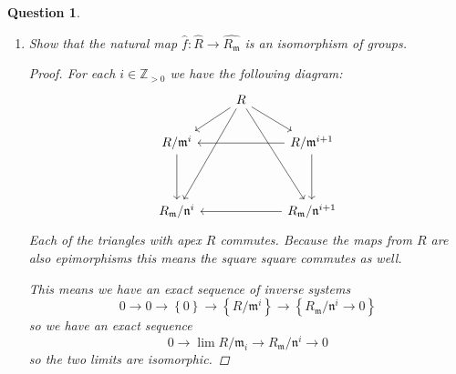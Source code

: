\documentclass{article}
\newcommand{\Z}{\mathbb{Z}}
\newcommand{\set}[1]{\left\{#1\right\}}
\newcommand{\maxid}{\mathfrak{m}}
\newcommand{\maxidd}{\mathfrak{n}}
\newtheorem{question}{Question}
\theoremstyle{definition}
\begin{document}
\begin{question}
\begin{enumerate}[a]
\begin{proof}
                  To show this is the induced map, we consider how this found
                  isomorphism works. Given some \(x\in R\) we have get the
                  following sequence from the above isomorphisms:
                  \[
                      R/\maxid^{i}\ni\overline{r}\mapsto \overline{\frac{r}{1}}\mapsto\frac{\overline{r}}{\overline{1}}=\overline{f(r)}\in R_{\maxid}/\maxidd^{i}.
                  \]
                  Therefore the isomorphism is the induced morphism.
              \end{proof}

        \item Show that the natural map
              \(\widehat{f}:\widehat{R}\to\widehat{R_{\maxid}}\) is an
              isomorphism of groups.

              \begin{proof}
                  For each \(i\in\Z_{>0}\) we have the following diagram:
                  \[
                      \begin{tikzcd}[ampersand replacement=\&]
                          \& R \\
                          {R/\maxid^{i}} \&\& {R/\maxid^{i+1}} \\
                          \\
                          {R_{\maxid}/\maxidd^{i}} \&\& {R_{\maxid}/\maxidd^{i+1}}
                          \arrow[from=1-2, to=2-1]
                          \arrow[from=2-3, to=2-1]
                          \arrow[from=2-1, to=4-1]
                          \arrow[from=1-2, to=4-1]
                          \arrow[from=2-3, to=4-3]
                          \arrow[from=4-3, to=4-1]
                          \arrow[from=1-2, to=2-3]
                          \arrow[from=1-2, to=4-3]
                      \end{tikzcd}
                  \]
                  Each of the triangles with apex \(R\) commutes. Because the
                  maps from \(R\) are also epimorphisms this means the square
                  square commutes as well.

                  This means we have an exact sequence of inverse systems
                  \[
                      0\to0\to\set{0}\to\set{R/\maxid^{i}}\to\set{R_{\maxid}/\maxidd^{i}\to 0}
                  \]
                  so we have an exact sequence
                  \[
                      0\to\lim R/\maxid_{i}\to R_{\maxid}/\maxidd^{i}\to 0
                  \]
                  so the two limits are isomorphic.
              \end{proof}
    \end{enumerate}
\end{question}
\end{document}
